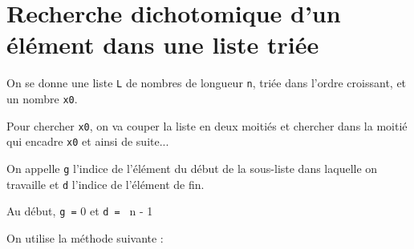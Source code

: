 	
%
%
%
%
%
%
%
%
%

	
\section{Recherche dichotomique d'un élément dans une liste triée}

On se donne une liste \texttt{L} de nombres de longueur \texttt{n}, {triée dans l'ordre croissant}, et un nombre \texttt{x0}. 

Pour chercher \texttt{x0}, on va couper la liste en deux moitiés et chercher dans la moitié qui encadre \texttt{x0} et ainsi de suite...

On appelle \texttt{g} l'indice de l'élément du début de la sous-liste dans laquelle on travaille et \texttt{d} l'indice de l'élément de fin.

Au début, \texttt{g =} {0} et \texttt{d = } {n - 1}

%

\medskip 
On utilise la méthode suivante :

